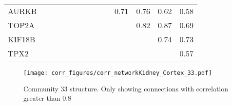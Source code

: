\begin{longtable}{lrrrrrrrrrrrrr}
AURKB  &             &            &             &              &             &             &              &             &             &        0.71 &         0.76 &       0.62 &        0.58 \\
TOP2A  &             &            &             &              &             &             &              &             &             &             &         0.82 &       0.87 &        0.69 \\
KIF18B &             &            &             &              &             &             &              &             &             &             &              &       0.74 &        0.73 \\
TPX2   &             &            &             &              &             &             &              &             &             &             &              &            &        0.57 \\
\end{longtable}


\begin{figure}[h!]
\centering
\texttt{[image: corr\_figures/corr\_networkKidney\_Cortex\_33.pdf]}
\caption{Community 33 structure. Only showing connections with correlation greater than 0.8}
\end{figure}




